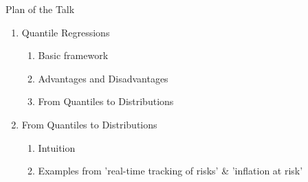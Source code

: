 \documentclass[xcolor=dvipsnames, xcolor=table, 10pt]{beamer}
\newcommand{\rr}[1]{{\color{darkred}#1}}
\begin{document}



\begin{frame}{Plan of the Talk}

\begin{enumerate}
    \item Quantile Regressions
    \begin{enumerate}
    \smallskip
        \item Basic framework
        \medskip
        \item Advantages and Disadvantages
        \medskip
        \item From Quantiles to Distributions
    \end{enumerate}
    \bigskip
    \item From Quantiles to Distributions
    \begin{enumerate}
    \smallskip
        \item Intuition
        \medskip
        \item Examples from 'real-time tracking of risks' \& 'inflation at risk'
        \medskip
    \end{enumerate}
\end{enumerate}

\end{frame}
\end{document}
